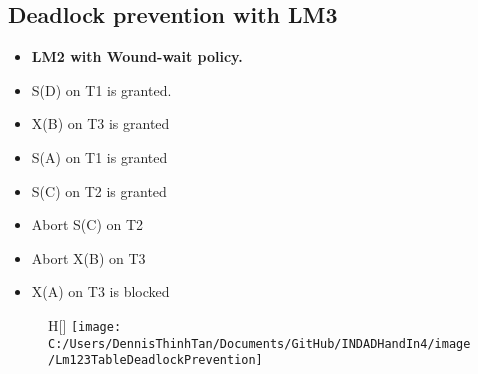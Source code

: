 \subsection{Deadlock prevention with LM3} \label{deadlockLM3section}

\begin{itemize}
	\item{\textbf{LM2 with Wound-wait policy.}}
	\item S(D) on T1 is granted.
	\item X(B) on T3 is granted
	\item S(A) on T1 is granted
	\item S(C) on T2 is granted
	\item Abort S(C) on T2
	\item Abort X(B) on T3
	\item X(A) on T3 is blocked
\end{itemize}

\begin{figure}H[]
\centering
\texttt{[image: C:/Users/DennisThinhTan/Documents/GitHub/INDADHandIn4/image/Lm123TableDeadlockPrevention]}
\caption[This is table is a visualization on LM1, LM2 and LM3.]{}
\caption{}
\label{fig:Lm123TableDeadlockPrevention}
\end{figure}
